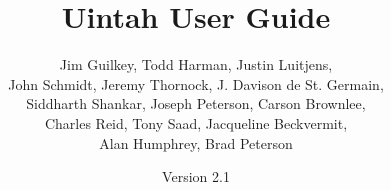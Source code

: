 \documentclass[12pt]{report}
\begin{document}
\title{Uintah User Guide}


\author{ Jim Guilkey, Todd Harman, Justin Luitjens, \\ John Schmidt, Jeremy Thornock, J. Davison de St. Germain, \\ Siddharth Shankar, Joseph Peterson, Carson Brownlee,\\ Charles Reid, Tony Saad, Jacqueline Beckvermit,\\Alan Humphrey, Brad Peterson }

\date{Version 2.1}

\maketitle

\tableofcontents

%

\newpage












\end{document}

